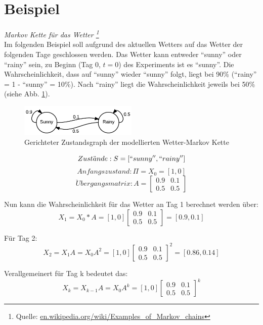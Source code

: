 \section{Beispiel} 
\textit{ Markov Kette für das Wetter \footnote{Quelle: \url{en.wikipedia.org/wiki/Examples_of_Markov_chains}}} \\
Im folgenden Beispiel soll aufgrund des aktuellen Wetters auf das Wetter der folgenden Tage geschlossen werden.
Das Wetter kann entweder ``sunny'' oder ``rainy'' sein, zu Beginn (Tag 0, \( t = 0 \)) des Experiments ist es ``sunny''.
Die Wahrscheinlichkeit, dass auf ``sunny'' wieder ``sunny'' folgt, liegt bei 90\% (``rainy'' = 1 - ``sunny'' = 10\%). 
Nach ``rainy'' liegt die Wahrscheinlichkeit jeweils bei 50\% (siehe Abb. \ref{fig:simple_mc_example}).  
\begin{figure}[htbp] \centering
    \includegraphics[width=0.5\textwidth]{Bilder/Kap2/simple_mc_example.png}
    \caption{ Gerichteter Zustandsgraph der modellierten Wetter-Markov Kette }
    \label{fig:simple_mc_example}
\end{figure}


\[ Zust\ddot{a}nde: S = [``sunny'', ``rainy''] \]
\[ Anfangszustand:  \Pi = X_0 = [1 , 0] \]
\[\ddot{U}bergangsmatrix: A = \begin {bmatrix} 0.9&0.1\\0.5&0.5 \end {bmatrix}
\]

Nun kann die Wahrscheinlichkeit für das Wetter an Tag 1 berechnet werden über: \\
\[ X_1 = X_0 * A = [ 1, 0 ] \begin {bmatrix} 0.9&0.1\\0.5&0.5 \end {bmatrix} = [ 0.9, 0.1] \]

Für Tag 2:\\
\[ X_2 = X_1 A = X_0 A^2 = [ 1, 0 ] \begin {bmatrix} 0.9&0.1\\0.5&0.5 \end {bmatrix}^2 = [ 0.86, 0.14] \] 

Verallgemeinert für Tag k bedeutet das: 
\[ X_k = X_{k-1} A = X_0 A^k = [ 1, 0 ] \begin {bmatrix} 0.9&0.1\\0.5&0.5 \end {bmatrix}^k \] 


